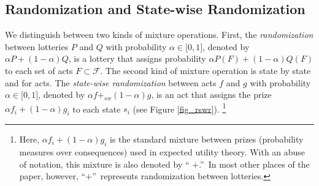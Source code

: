 \documentclass[12pt, notitlepage]{article}
\begin{document}
\subsection{Randomization and State-wise Randomization}

\label{rswr}We distinguish between two kinds of mixture operations. First,
the \textit{randomization} between lotteries $P$ and $Q$ with probability $%
\alpha \in \lbrack 0,1]$, denoted by $\alpha P+(1-\alpha )Q$, is a lottery
that assigns probability $\alpha P(F)+(1-\alpha )Q(F)$ to each set of acts $%
F\subset \mathcal{F}$. The second kind of mixture operation is state by
state and for acts. The \textit{state-wise randomization} between acts $f$
and $g$ with probability $\alpha \in \lbrack 0,1]$, denoted by $\alpha
f+_{sw}(1-\alpha )g$, is an act that assigns the prize $\alpha
f_{i}+(1-\alpha )g_{i}$ to each state $s_{i}$ (see Figure \ref{fig_rswr}).%
\footnote{%
Here, $\alpha f_{i}+(1-\alpha )g_{i}$ is the standard mixture between prizes
(probability measures over consequences) used in expected utility theory.
With an abuse of notation, this mixture is also denoted by \textquotedblleft 
$+$.\textquotedblright\ In most other places of the paper, however,
\textquotedblleft $+$\textquotedblright\ represents randomization between
lotteries.}

\end{document}
